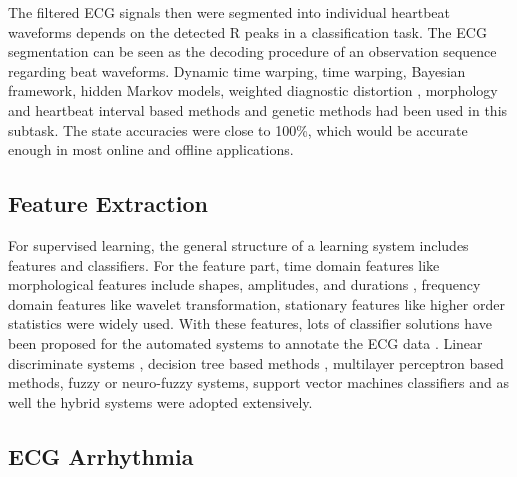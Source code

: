 \documentclass[journal]{IEEEtran}
\begin{document}
The filtered ECG signals then were segmented into individual heartbeat waveforms depends on the detected R peaks in a classification task. The ECG segmentation can be seen as the decoding procedure of an observation sequence regarding beat waveforms\cite{andreao2006ecg}. Dynamic time warping\cite{vullings1998automated}, time warping\cite{vullings1997ecg}, Bayesian framework\cite{sayadi2009model}, hidden Markov models\cite{andreao2006ecg}, weighted diagnostic distortion \cite{zigel2000weighted}, morphology and heartbeat interval based methods\cite{de2004automatic} and genetic methods\cite{gacek2003genetic} had been used in this subtask. The state accuracies were close to 100\%, which would be accurate enough in most online and offline applications.

\subsection{Feature Extraction}
For supervised learning, the general structure of a learning system includes features and classifiers. For the feature part, time domain features like morphological features include shapes, amplitudes, and durations \cite{jekova, christove, can}, frequency domain features like wavelet transformation\cite{inan}, \cite{banerjee} stationary features like higher order statistics were widely used. With these features, lots of classifier solutions have been proposed for the automated systems to annotate the ECG data \cite{osowski, vullings1998automated, sayadi2009model}. Linear discriminate systems \cite{shinwari2012classification}, decision tree based methods \cite{krasteva2014classification, charfi2012comparative}, multilayer perceptron based methods, fuzzy or neuro-fuzzy systems\cite{erhan2009difficulty,vafaie2014heart }, support vector machines classifiers\cite{ubeyli2007ecg} and as well the hybrid systems\cite{homaeinezhad2012ecg, vanitha2013hybrid} were adopted extensively.

\subsection{ECG Arrhythmia}
\end{document}
